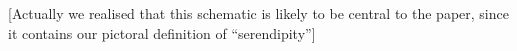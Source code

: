 [Actually we realised that this schematic is likely to be central to the paper, since it contains our pictoral definition of ``serendipity'']